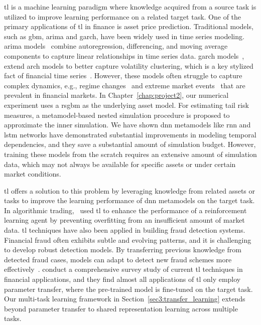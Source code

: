 \gls{tl} is a machine learning paradigm where knowledge acquired from a source task is utilized to improve learning performance on a related target task.
One of the primary applications of \gls{tl} in finance is asset price prediction. 
Traditional models, such as \gls{gbm}, \gls{arima} and \gls{garch}, have been widely used in time series modeling.
\gls{arima} models~\citep{box1970distribution} combine autoregression, differencing, and moving average components to capture linear relationships in time series data.
\gls{garch} models~\citep{bollerslev1990modelling}, extend \gls{arch} models to better capture volatility clustering, which is a key stylized fact of financial time series~\citep{cont2001empirical}.
However, these models often struggle to capture complex dynamics, e.g., regime changes~\citep{hamilton1989new} and extreme market events~\citep{embrechts2013modelling} that are prevalent in financial markets.
In Chapter~\ref{chap:project2}, our numerical experiment uses a \gls{rsgbm} as the underlying asset model.
For estimating tail risk measures, a metamodel-based nested simulation procedure is proposed to approximate the inner simulation.
We have shown \gls{dnn} metamodels like \gls{rnn} and \gls{lstm} networks have demonstrated substantial improvements in modeling temporal dependencies, and they save a substantial amount of simulation budget.
However, training these models from the scratch requires an extensive amount of simulation data, which may not always be available for specific assets or under certain market conditions.

\gls{tl} offers a solution to this problem by leveraging knowledge from related assets or tasks to improve the learning performance of \gls{dnn} metamodels on the target task.
In algorithmic trading,~\cite{jeong2019improving} used \gls{tl} to enhance the performance of a reinforcement learning agent by preventing overfitting from an insufficient amount of market data.
\gls{tl} techniques have also been applied in building fraud detection systems. 
Financial fraud often exhibits subtle and evolving patterns, and it is challenging to develop robust detection models.
By transferring previous knowledge from detected fraud cases, models can adapt to detect new fraud schemes more effectively~\citep{lebichot2021transfer}.
\cite{yan2024comprehensive} conduct a comprehensive survey study of current \gls{tl} techniques in financial applications, and they find almost all applications of \gls{tl} only employ parameter transfer, where the pre-trained model is fine-tuned on the target task.
Our multi-task learning framework in Section~\ref{sec3:transfer_learning} extends beyond parameter transfer to shared representation learning across multiple tasks.

